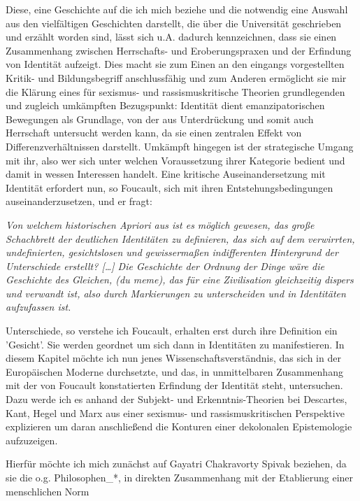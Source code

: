 Diese, eine Geschichte auf die ich mich beziehe und die notwendig eine Auswahl aus den vielfältigen Geschichten
darstellt, die über die Universität geschrieben und erzählt worden sind, lässt
sich u.A. dadurch kennzeichnen, dass sie einen Zusammenhang zwischen
Herrschafts- und Eroberungspraxen und der Erfindung von Identität aufzeigt. Dies
macht sie zum Einen an den eingangs vorgestellten Kritik- und Bildungsbegriff
anschlussfähig und zum Anderen ermöglicht sie mir die Klärung eines für
sexismus- und rassismuskritische Theorien grundlegenden und zugleich umkämpften
Bezugspunkt: Identität dient emanzipatorischen Bewegungen als Grundlage, von der
aus Unterdrückung und somit auch Herrschaft untersucht werden kann, da sie einen
zentralen Effekt von Differenzverhältnissen darstellt. Umkämpft hingegen ist der
strategische Umgang mit ihr, also wer sich unter welchen Voraussetzung ihrer
Kategorie bedient und damit in wessen Interessen handelt. Eine kritische
Auseinandersetzung mit Identität erfordert nun, so Foucault, sich mit ihren
Entstehungsbedingungen auseinanderzusetzen, und er fragt: 
\begin{myenv} \textit{
\glqq    Von welchem historischen Apriori aus ist es möglich gewesen, das große
    Schachbrett der deutlichen Identitäten zu definieren, das sich auf dem
    verwirrten, undefinierten, gesichtslosen und gewissermaßen indifferenten
    Hintergrund der Unterschiede erstellt? […] Die Geschichte der Ordnung der
    Dinge wäre die Geschichte des Gleichen, (du meme), das für eine Zivilisation
    gleichzeitig dispers und verwandt ist, also durch Markierungen zu
    unterscheiden und in Identitäten aufzufassen ist.\grqq \footnotemark
   }
\end{myenv}

Unterschiede, so verstehe ich Foucault, erhalten erst durch ihre Definition ein
'Gesicht'. Sie werden geordnet um sich dann in Identitäten zu manifestieren. In
diesem Kapitel möchte ich nun jenes Wissenschaftsverständnis, das sich in der
Europäischen Moderne durchsetzte, und das, in unmittelbaren Zusammenhang mit der
von Foucault konstatierten Erfindung der Identität steht, untersuchen. Dazu
werde ich es anhand der Subjekt- und Erkenntnis-Theorien bei Descartes, Kant,
Hegel und Marx aus einer sexismus- und rassismuskritischen Perspektive
explizieren um daran anschließend die Konturen einer dekolonalen Epistemologie
aufzuzeigen.

Hierfür möchte ich mich zunächst auf Gayatri Chakravorty Spivak beziehen, da
sie die o.g. Philosophen\_*, in direkten Zusammenhang mit der Etablierung einer
\glqq menschlichen Norm \grqq \footnotemark {}

